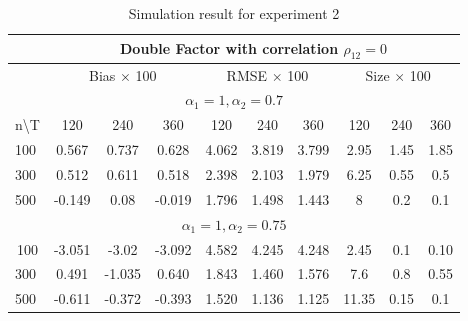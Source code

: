 \begin{table}[!hbt]
		\caption{Simulation result for experiment 2}\label{table:exp2}
	\centering
	\begin{tabular}{lccccccccc}
		\hline
		\hline
\multicolumn{1}{l|}{}                   & \multicolumn{9}{c}{Double Factor with correlation $\rho_{12} = 0$}                                                                \\ \hline
\multicolumn{1}{l|}{}                   & \multicolumn{3}{c|}{Bias $\times$ 100}        & \multicolumn{3}{c|}{RMSE $\times$ 100}      & \multicolumn{3}{c}{Size $\times$ 100} \\ \hline
\multicolumn{10}{c}{$\alpha_1 = 1, \alpha_2  = 0.7$}                                                                                                                           \\ \hline
\multicolumn{1}{l|}{n\textbackslash{}T} & 120    & 240    & \multicolumn{1}{c|}{360}    & 120    & 240   & \multicolumn{1}{c|}{360}   & 120         & 240        & 360         \\ \hline
\multicolumn{1}{l|}{100}                & 0.567  & 0.737  & \multicolumn{1}{c|}{0.628}  & 4.062  & 3.819 & \multicolumn{1}{c|}{3.799} & 2.95        & 1.45       & 1.85        \\
\multicolumn{1}{l|}{300}                & 0.512  & 0.611  & \multicolumn{1}{c|}{0.518}  & 2.398  & 2.103 & \multicolumn{1}{c|}{1.979} & 6.25        & 0.55       & 0.5         \\
\multicolumn{1}{l|}{500}                & -0.149 & 0.08   & \multicolumn{1}{c|}{-0.019} & 1.796  & 1.498 & \multicolumn{1}{c|}{1.443} & 8           & 0.2        & 0.1         \\ \hline
\multicolumn{10}{c}{$\alpha_1 = 1, \alpha_2 =0.75$}                                                                                                                              \\ \hline
\multicolumn{1}{c|}{100}                & -3.051 & -3.02  & \multicolumn{1}{c|}{-3.092} & 4.582  & 4.245 & \multicolumn{1}{c|}{4.248} & 2.45        & 0.1        & 0.10        \\
\multicolumn{1}{l|}{300}                & 0.491  & -1.035 & \multicolumn{1}{c|}{0.640}  & 1.843  & 1.460 & \multicolumn{1}{c|}{1.576} & 7.6         & 0.8        & 0.55        \\
\multicolumn{1}{l|}{500}                & -0.611 & -0.372 & \multicolumn{1}{c|}{-0.393} & 1.520  & 1.136 & \multicolumn{1}{c|}{1.125} & 11.35       & 0.15       & 0.1         \\ \hline

\end{tabular}
\end{table}
